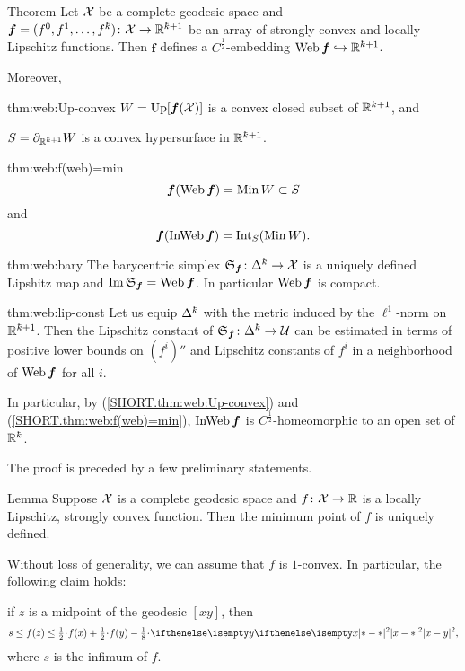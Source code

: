 \begin{thm}{Theorem}\label{thm:web}
Let $\mathcal{X}$ be a complete geodesic space 
and $\bm{f}\z=(f^0,f^1,\dots,f^\kay)\:\spc{X}\to\RR^{\kay+1}$ 
be an array of strongly convex and locally Lipschitz functions.
Then $\bm{f}$ defines a $C^{\frac12}$-embedding 
$\Web\bm{f}\hookrightarrow\RR^{\kay+1}$.

Moreover,
\begin{subthm}{thm:web:Up-convex}
$W=\mathop{\rm Up}\nolimits[\bm{f}(\mathcal{X})]$ is a convex closed subset of $\RR^{\kay+1}$,
and

$S=\Fr_{\RR^{\kay+1}} W$ is a convex hypersurface in $\RR^{\kay+1}$.
\end{subthm}

\begin{subthm}{thm:web:f(web)=min}
\[\bm{f}(\Web\bm{f})=\Min W \subset S\]
and
\[\bm{f}(\mathop{\rm InWeb}\nolimits\bm{f})= \mathop{\rm Int}\nolimits_{S}(\mathop{\rm Min}\nolimits W).\]
\end{subthm}

\begin{subthm}{thm:web:bary}
The barycentric simplex 
$\spx{\bm{f}}\:\Delta^\kay\to \spc{X}$ is a uniquely defined Lipshitz map and $\mathop{\rm Im}\nolimits\mathfrak{S}_{\bm{f}}=\mathop{\rm Web}\nolimits\bm{f}$.
In particular $\mathop{\rm Web}\nolimits\bm{f}$ is compact.
\end{subthm}

\begin{subthm}{thm:web:lip-const}
Let us equip $\Delta^\kay$ with the metric induced by the $\ell^1$-norm on $\RR^{\kay+1}$.
Then the Lipschitz constant of $\spx{\bm{f}}\:\Delta^\kay\to\spc{U}$ can be estimated in terms of 
positive lower bounds on $(f^i)''$ 
and Lipschitz constants of $f^i$
in a neighborhood of $\mathop{\rm Web}\nolimits\bm{f}$ for all $i$.
\end{subthm}


In particular, by (\ref{SHORT.thm:web:Up-convex}) and (\ref{SHORT.thm:web:f(web)=min}),  $\mathop{\rm InWeb}\nolimits\bm{f}$ is $C^{\frac12}$-homeomorphic to an open set of $\RR^\kay$.
\end{thm}

The proof is preceded by a few preliminary statements.

\begin{thm}{Lemma}\label{lem:argmin(convex)}
Suppose $\mathcal{X}$ is a complete geodesic space and $f\:\spc{X}\to\RR$ is a locally Lipschitz, strongly convex function. Then the minimum point 
of $f$
is uniquely defined.
\end{thm}

Without loss of generality, we can assume that $f$ is $1$-convex.
In particular, the following claim holds:
\begin{clm}{}\label{midpoint}
 if $z$ is a midpoint of the geodesic $[x y]$, then 
\[s\le f(z)
\le
\tfrac{1}{2}\cdot f(x)+\tfrac{1}{2}\cdot f(y)-\tfrac{1}{8}\cdot\dist[2]{x}{y}{},
\]
where $s$ is the infimum of $f$.
\end{clm}


